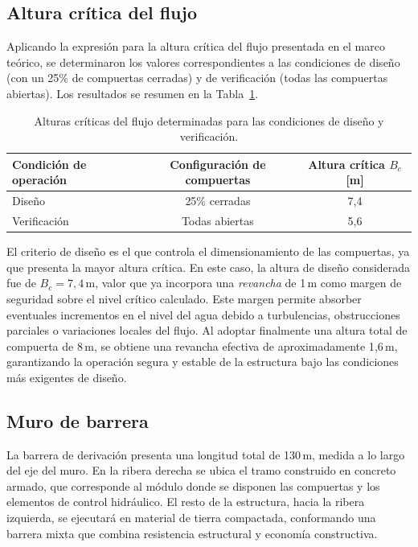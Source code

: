 \documentclass{article} %
\begin{document}
\subsection{Altura crítica del flujo}

Aplicando la expresión para la altura crítica del flujo presentada en el marco teórico, se determinaron los valores correspondientes a las condiciones de diseño (con un 25\% de compuertas cerradas) y de verificación (todas las compuertas abiertas). Los resultados se resumen en la Tabla~\ref{tab:bcresultados}.

\begin{table}[htbp]
\centering
\begin{tabular}{lcc}
\hline
Condición de operación & Configuración de compuertas & Altura crítica \( B_c \) [m] \\
\hline
Diseño & 25\% cerradas & 7,4 \\
Verificación & Todas abiertas & 5,6 \\
\hline
\end{tabular}
\caption{Alturas críticas del flujo determinadas para las condiciones de diseño y verificación.}
\label{tab:bcresultados}
\end{table}

El criterio de diseño es el que controla el dimensionamiento de las compuertas, ya que presenta la mayor altura crítica. En este caso, la altura de diseño considerada fue de \( B_c = 7{,}4\,\text{m} \), valor que ya incorpora una \textit{revancha} de 1\,m como margen de seguridad sobre el nivel crítico calculado. Este margen permite absorber eventuales incrementos en el nivel del agua debido a turbulencias, obstrucciones parciales o variaciones locales del flujo. Al adoptar finalmente una altura total de compuerta de 8\,m, se obtiene una revancha efectiva de aproximadamente 1{,}6\,m, garantizando la operación segura y estable de la estructura bajo las condiciones más exigentes de diseño.

\subsection{Muro de barrera}

La barrera de derivación presenta una longitud total de 130\,m, medida a lo largo del eje del muro. En la ribera derecha se ubica el tramo construido en concreto armado, que corresponde al módulo donde se disponen las compuertas y los elementos de control hidráulico. El resto de la estructura, hacia la ribera izquierda, se ejecutará en material de tierra compactada, conformando una barrera mixta que combina resistencia estructural y economía constructiva.
\end{document}
